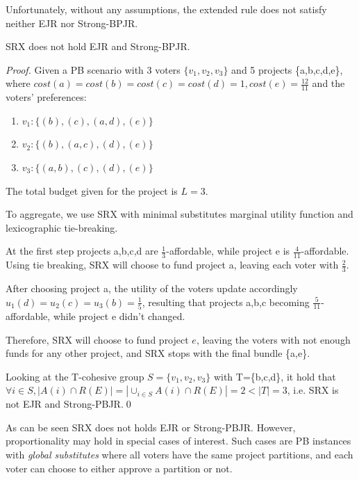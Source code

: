 \documentclass[runningheads]{llncs}
\begin{document}
Unfortunately, without any assumptions, the extended rule does not satisfy neither EJR nor Strong-BPJR.

\begin{theorem}
SRX does not hold EJR and Strong-BPJR.
\end{theorem}

\begin{proof}
Given a PB scenario with 3 voters $\{v_1,v_2,v_3\}$ and 5 projects \{a,b,c,d,e\}, where $cost(a)=cost(b)=cost(c)=cost(d)=1, cost(e)=\frac{12}{11}$ and the voters' preferences:
\begin{enumerate}
    \item $v_1: \{(b),(c),(a,d),(e)\}$
    \item $v_2: \{(b),(a,c),(d),(e)\}$
    \item $v_3: \{(a,b),(c),(d),(e)\}$
\end{enumerate}

The total budget given for the project is $L=3$.

To aggregate, we use SRX with minimal substitutes marginal utility function and lexicographic tie-breaking.

At the first step projects a,b,c,d are $\frac{1}{3}$-affordable, while project e is $\frac{4}{11}$-affordable. Using tie breaking, SRX will choose to fund project a, leaving each voter with $\frac{2}{3}$.

After choosing project a, the utility of the voters update accordingly $u_1(d)=u_2(c)=u_3(b)=\frac{1}{5}$, resulting that projects a,b,c becoming $\frac{5}{11}$-affordable, while project e didn't changed.

Therefore, SRX will choose to fund project $e$, leaving the voters with not enough funds for any other project, and SRX stops with the final bundle \{a,e\}.

Looking at the T-cohesive group $S=\{v_1,v_2,v_3\}$ with T=\{b,c,d\}, it hold that $\forall i\in S, |A(i)\cap R(E)|=|\cup_{i\in S}A(i)\cap R(E)|=2<|T|=3$, i.e. SRX is not EJR and Strong-PBJR.\qed
\end{proof}

As can be seen SRX does not holds EJR or Strong-PBJR.  However, proportionality may hold in special cases of interest. Such cases are PB instances with \emph{global substitutes} \cite{jain2021partition} where all voters have the same project partitions, and each voter can choose to either approve a partition or not. 
\end{document}
